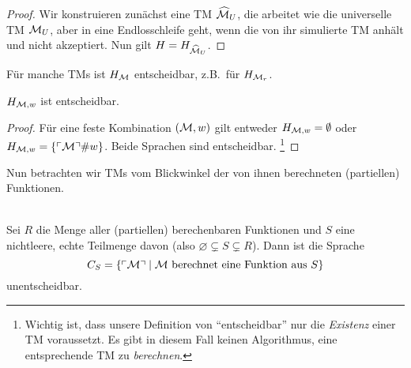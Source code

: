 \begin{proof}
	Wir konstruieren zunächst eine \ac{TM} $\widehat{\mathcal{M}}_U$, die arbeitet wie die universelle \ac{TM} $\mathcal{M}_U$, aber in eine Endlosschleife geht, wenn die von ihr simulierte \ac{TM} anhält und nicht akzeptiert.
	Nun gilt $H = H_{\widehat{\mathcal{M}}_U}$.
\end{proof}

\begin{Bemerkung}
	Für manche \ac{TM}s ist $H_{\mathcal{M}}$ entscheidbar, z.B.\ für $H_{\mathcal{M}_r}$.
\end{Bemerkung}

\begin{lemma}
	$H_{\mathcal{M}, w}$ ist entscheidbar.
\end{lemma}

\begin{proof}
	Für eine feste Kombination $(\mathcal{M}, w)$ gilt entweder $H_{\mathcal{M}, w} = \emptyset$ oder  $H_{\mathcal{M}, w} = \{\ulcorner \mathcal{M} \urcorner\# w\}$.
	Beide Sprachen sind entscheidbar.%
	\footnote{Wichtig ist, dass unsere Definition von "`entscheidbar"' nur die \emph{Existenz} einer \ac{TM} voraussetzt.
	Es gibt in diesem Fall keinen Algorithmus, eine entsprechende \ac{TM} zu \emph{berechnen}.}
\end{proof}



Nun betrachten wir \ac{TM}s vom Blickwinkel der von ihnen berechneten
(partiellen) Funktionen.

\begin{Satz}\ \\
  Sei $R$ die Menge aller (partiellen) berechenbaren Funktionen und $S$
  eine nichtleere, echte Teilmenge davon (also $\varnothing \subsetneq S \subsetneq R$).
  Dann ist die Sprache
  $$C_S=\{\ulcorner \mathcal{M} \urcorner \mid \mathcal{M} \text{ berechnet eine Funktion aus }S\}$$
  unentscheidbar.
\end{Satz}


